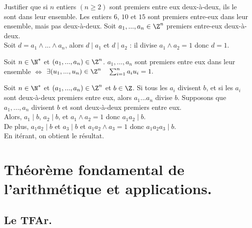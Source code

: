 \documentclass[11pt]{article}
\begin{document}
\begin{ex}{}{}
    Justifier que si $n$ entiers $(n\geq2)$ sont premiers entre eux deux-à-deux, ils le sont dans leur ensemble.\n
    Les entiers $6$, $10$ et $15$ sont premiers entre-eux dans leur ensemble, mais pas deux-à-deux.
    \tcblower
    Soit $a_1,...,a_n\in\Z^n$ premiers entre-eux deux-à-deux.\\
    Soit $d=a_1\land ... \land a_n$, alors $d\mid a_1$ et $d\mid a_2$ : il divise $a_1\land a_2=1$ donc $d=1$.
\end{ex}

\pagebreak

\begin{thm}{}{}
    Soit $n\in\N^*$ et $(a_1,...,a_n)\in\Z^n$.\n
    $a_1,...,a_n$ sont premiers entre eux dans leur ensemble $\iff$ $\exists(u_1,...,u_n)\in\Z^n\quad\sum_{i=1}^na_iu_i=1.$
\end{thm}

\begin{prop}{}{}
    Soit $n\in\N^*$ et $(a_1,...,a_n)\in\Z^n$ et $b\in\Z$.\n
    Si tous les $a_i$ divisent $b$, et si les $a_i$ sont deux-à-deux premiers entre eux, alors $a_1...a_n$ divise $b$.
    \tcblower
    Supposons que $a_1,...,a_n$ divisent $b$ et sont deux-à-deux premiers entre eux.\\
    Alors, $a_1 \mid b$, $a_2\mid b$, et $a_1 \land a_2=1$ donc $a_1a_2\mid b$.\\
    De plus, $a_1a_2 \mid b$ et $a_3 \mid b$ et $a_1a_2\land a_3=1$ donc $a_1a_2a_3\mid b$.\\
    En itérant, on obtient le résultat.
\end{prop}

\section{Théorème fondamental de l'arithmétique et applications.}
\subsection{Le TFAr.}
\end{document}
